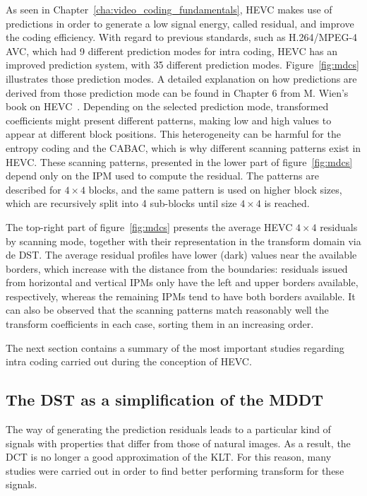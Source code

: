 \documentclass[11pt,a4paper,openright,twoside]{book}
\numberwithin{equation}{section} %
\numberwithin{figure}{section} %
\numberwithin{table}{section} %
\begin{document}
As seen in Chapter~\ref{cha:video_coding_fundamentals}, \ac{HEVC} makes
use of predictions in order to generate a low signal energy, called
residual, and improve the coding efficiency.
With regard to previous standards, such as H.264/\ac{MPEG}-4 \ac{AVC},
which had 9 different prediction modes for intra coding, \ac{HEVC} has
an improved prediction system, with 35 different prediction modes.
Figure~\ref{fig:mdcs} illustrates those prediction modes.
A detailed explanation on how predictions are derived from those
prediction mode can be found in Chapter 6 from M.
Wien's book on \ac{HEVC}~\cite{wien-15-hevc}.
Depending on the selected prediction mode, transformed coefficients might
present different patterns, making low and high values to appear at different
block positions.
This heterogeneity can be harmful for the entropy coding and the
\ac{CABAC}, which is why different scanning patterns exist in \ac{HEVC}.
These scanning patterns, presented in the lower part of
figure~\ref{fig:mdcs} depend only on the \ac{IPM} used to compute the
residual.
The patterns are described for $4\times4$ blocks, and the same pattern is used
on higher block sizes, which are recursively split into 4 sub-blocks until
size $4\times4$ is reached.

The top-right part of figure~\ref{fig:mdcs} presents the average
\ac{HEVC} $4\times4$ residuals by scanning mode, together with their
representation in the transform domain via de \ac{DST}.
The average residual profiles have lower (dark) values near the
available borders, which increase with the distance from the
boundaries: residuals issued from horizontal and vertical \acp{IPM} only
have the left and upper borders available, respectively, whereas the
remaining \acp{IPM} tend to have both borders available.
It can also be observed that the scanning patterns match reasonably well
the transform coefficients in each case, sorting them in an increasing
order.

The next section contains a summary of the most important studies
regarding intra coding carried out during the conception of \ac{HEVC}.

\subsection{The \acs{DST} as a simplification of the \acs{MDDT}}
\label{sub:dst_and_mddt}

The way of generating the prediction residuals leads to a particular
kind of signals with properties that differ from those of natural
images.
As a result, the \ac{DCT} is no longer a good approximation of the
\ac{KLT}.
For this reason, many studies were carried out in order to find better
performing transform for these signals.
\end{document}
